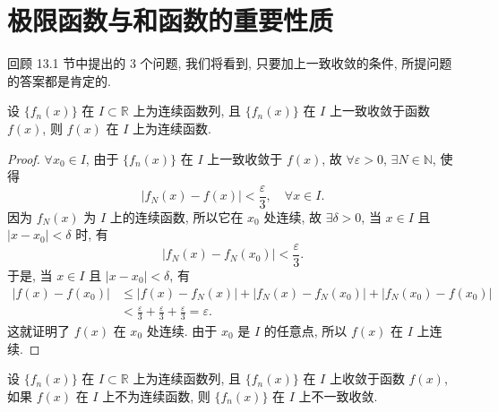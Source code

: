 \section{极限函数与和函数的重要性质}\label{sec:13.2}

回顾 13.1 节中提出的 3 个问题, 我们将看到, 只要加上一致收敛的条件, 所提问题的答案都是肯定的.

\begin{theorem}\label{thm:13.2.1}
设 $\{f_{n}(x)\}$ 在 $I\subset\mathbb{R}$ 上为连续函数列, 且 $\{f_{n}(x)\}$ 在 $I$ 上一致收敛于函数 $f(x)$, 则 $f(x)$ 在 $I$ 上为连续函数.
\end{theorem}

\begin{proof}
$\forall x_{0}\in I$, 由于 $\{f_{n}(x)\}$ 在 $I$ 上一致收敛于 $f(x)$, 故 $\forall\varepsilon>0$, $\exists N\in\mathbb{N}$, 使得
\[
  |f_{N}(x)-f(x)|<\frac{\varepsilon}{3},\quad\forall x\in I.
\]
因为 $f_{N}(x)$ 为 $I$ 上的连续函数, 所以它在 $x_{0}$ 处连续, 故 $\exists\delta>0$, 当 $x\in I$ 且 $|x-x_{0}|<\delta$ 时, 有
\[
  |f_{N}(x)-f_{N}(x_{0})|<\frac{\varepsilon}{3}.
\]
于是, 当 $x\in I$ 且 $|x-x_{0}|<\delta$, 有
\[
  \begin{aligned}
    |f(x)-f(x_{0})|&\leqslant|f(x)-f_{N}(x)|+|f_{N}(x)-f_{N}(x_{0})|+|f_{N}(x_{0})-f(x_{0})|\\
    &<\frac{\varepsilon}{3}+\frac{\varepsilon}{3}+\frac{\varepsilon}{3}=\varepsilon.
  \end{aligned}
\]
这就证明了 $f(x)$ 在 $x_{0}$ 处连续. 由于 $x_{0}$ 是 $I$ 的任意点, 所以 $f(x)$ 在 $I$ 上连续.
\end{proof}

\begin{corollary}\label{cor:13.2.1}
设 $\{f_{n}(x)\}$ 在 $I\subset\mathbb{R}$ 上为连续函数列, 且 $\{f_{n}(x)\}$ 在 $I$ 上收敛于函数 $f(x)$, 如果 $f(x)$ 在 $I$ 上不为连续函数, 则 $\{f_{n}(x)\}$ 在 $I$ 上不一致收敛.
\end{corollary}

